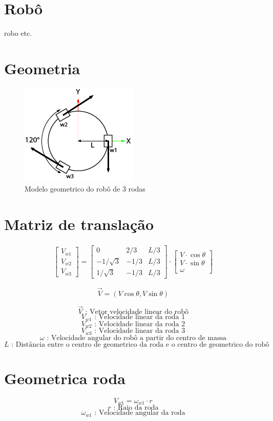 
\section{Robô}
robo etc.

\section{Geometria}

\begin{figure}[h]
	\centering
	\includegraphics{figures/model}
	\caption{Modelo geometrico do robô de 3 rodas}
\end{figure}

\section{Matriz de translação}

\begin{gather}
	\begin{bmatrix} V_{w1} \\  V_{w2} \\  V_{w3} \end{bmatrix}
	=
	\begin{bmatrix}
		0 & 2/3 & L/3 \\
		-1/\sqrt{3} & -1/3 & L/3\\
		1/\sqrt{3} & -1/3 & L/3
	\end{bmatrix}
	\cdot
	\begin{bmatrix} V\cdot \cos{\theta} \\  V\cdot \sin{\theta} \\  \omega \end{bmatrix}
\end{gather}

\[ \overrightarrow{V} = (V\cos{\theta} , V\sin{\theta}) \]



\[\overrightarrow{V} \text{ :  Vetor velocidade linear do robô} \]  
\[V_{w1}   \text{ :  Velocidade linear da roda 1} \]  
\[V_{w2}   \text{ :  Velocidade linear da roda 2} \]  
\[V_{w3}   \text{ :  Velocidade linear da roda 3} \] 
\[\omega   \text{ :  Velocidade angular do robô a partir do centro de massa} \]  
\[L   \text{ :  Distância entre o centro de geometrico da roda e o centro de geometrico do robô} \]  



\section{Geometrica roda}

\[V_{w1} = \omega_{w1}\cdot r \]  
\[r   \text{ :  Raio da roda} \]  
\[\omega_{w1}   \text{ :  Velocidade angular da roda} \] 

